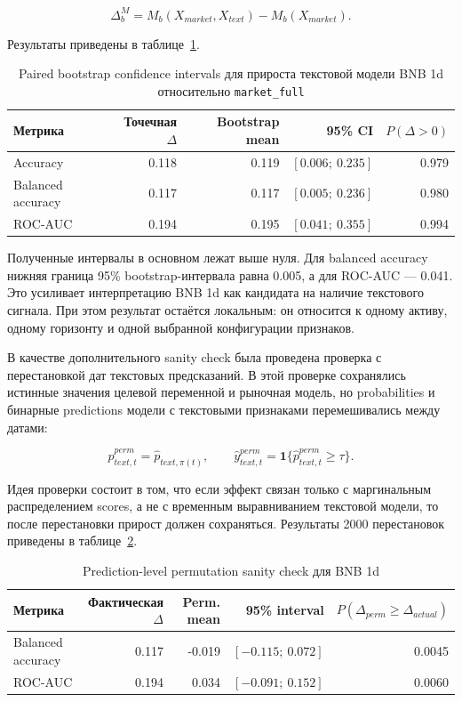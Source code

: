 \[
\Delta_{b}^{M}=M_b(X_{market},X_{text})-M_b(X_{market}).
\]

Результаты приведены в таблице~\ref{tab:run05_bnb_bootstrap_ci}.

\begin{table}[htbp]
\centering
\begin{tabular}{lrrrr}
\toprule
Метрика & Точечная $\Delta$ & Bootstrap mean & 95\% CI & $P(\Delta>0)$ \\
\midrule
Accuracy & 0.118 & 0.119 & $[0.006;\ 0.235]$ & 0.979 \\
Balanced accuracy & 0.117 & 0.117 & $[0.005;\ 0.236]$ & 0.980 \\
ROC-AUC & 0.194 & 0.195 & $[0.041;\ 0.355]$ & 0.994 \\
\bottomrule
\end{tabular}
\caption{Paired bootstrap confidence intervals для прироста текстовой модели BNB 1d относительно \texttt{market\_full}}
\label{tab:run05_bnb_bootstrap_ci}
\end{table}

Полученные интервалы в основном лежат выше нуля. Для balanced accuracy нижняя граница 95\% bootstrap-интервала равна 0.005, а для ROC-AUC --- 0.041. Это усиливает интерпретацию BNB 1d как кандидата на наличие текстового сигнала. При этом результат остаётся локальным: он относится к одному активу, одному горизонту и одной выбранной конфигурации признаков.

В качестве дополнительного sanity check была проведена проверка с перестановкой дат текстовых предсказаний. В этой проверке сохранялись истинные значения целевой переменной и рыночная модель, но probabilities и бинарные predictions модели с текстовыми признаками перемешивались между датами:

\[
\widehat p^{perm}_{text,t}=\widehat p_{text,\pi(t)},
\qquad
\widehat y^{perm}_{text,t}=\mathbf{1}\{\widehat p^{perm}_{text,t}\geq \tau\}.
\]

Идея проверки состоит в том, что если эффект связан только с маргинальным распределением scores, а не с временным выравниванием текстовой модели, то после перестановки прирост должен сохраняться. Результаты 2000 перестановок приведены в таблице~\ref{tab:run05_bnb_permutation_check}.

\begin{table}[htbp]
\centering
\begin{tabular}{lrrrr}
\toprule
Метрика & Фактическая $\Delta$ & Perm. mean & 95\% interval & $P(\Delta_{perm}\geq\Delta_{actual})$ \\
\midrule
Balanced accuracy & 0.117 & -0.019 & $[-0.115;\ 0.072]$ & 0.0045 \\
ROC-AUC & 0.194 & 0.034 & $[-0.091;\ 0.152]$ & 0.0060 \\
\bottomrule
\end{tabular}
\caption{Prediction-level permutation sanity check для BNB 1d}
\label{tab:run05_bnb_permutation_check}
\end{table}

